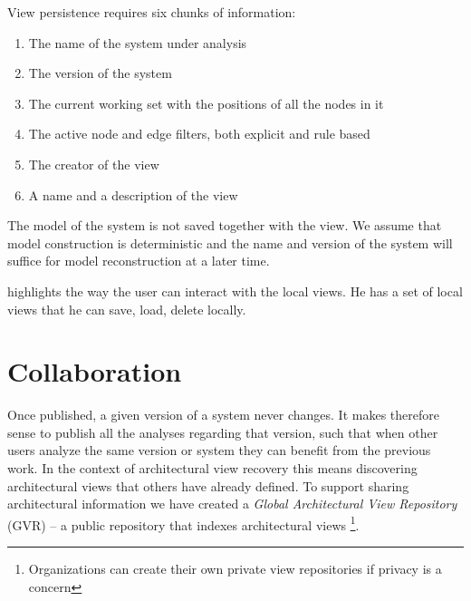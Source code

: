 \documentclass[preprint,12pt]{elsarticle}
\begin{document}
View persistence requires six chunks of information:

\begin{enumerate}
\item The name of the system under analysis
\item The version of the system 
\item The current working set with the positions of all the nodes in it
\item The active node and edge filters, both explicit and rule based
\item The creator of the view
\item A name and a description of the view
\end{enumerate}

The model of the system is not saved together with the view. We assume that model construction is deterministic and the name and version of the system will suffice for model reconstruction at a later time. %



 highlights the way the user can interact with the local views. He has a set of local views that he can save, load, delete locally. 


\newpage
\section {Collaboration}
\label {sec:collab}


Once published, a given version of a system never changes. It makes therefore sense to publish all the analyses regarding that version, such that when other users analyze the same version or system they can benefit from the previous work. In the context of architectural view recovery this means discovering architectural views that others have already defined. To support sharing architectural information we have created a {\em Global Architectural View Repository} (GVR) -- a public repository that indexes architectural views \footnote{
Organizations can create their own private view repositories if privacy is a concern}.
\end{document}
